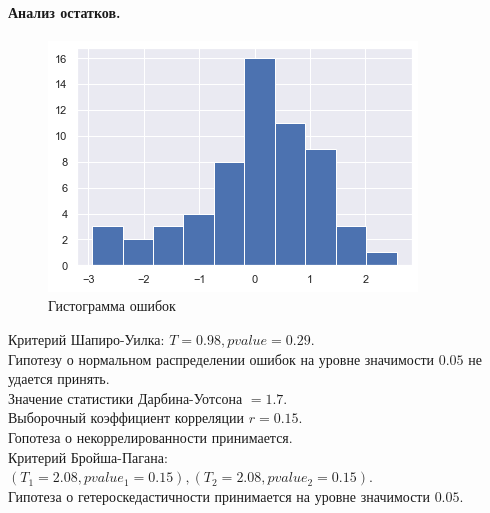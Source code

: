 \documentclass[a4paper,12pt]{article}
\begin{document}
\paragraph{Анализ остатков.\\}
\begin{figure}
    \vspace{-2ex}
    \includegraphics[width=\linewidth]{src/img/гистограмма_ошибок_1.png}
    \caption{Гистограмма ошибок}
\end{figure}

Критерий Шапиро-Уилка: $T = 0.98, pvalue = 0.29$.\\
Гипотезу о нормальном распределении ошибок на уровне значимости $0.05$ не удается принять.\\

Значение статистики Дарбина-Уотсона $ = 1.7$.\\
Выборочный коэффициент корреляции $r = 0.15$.\\
Гопотеза о некоррелированности принимается.\\

Критерий Бройша-Пагана: $(T_1 = 2.08, pvalue_1 = 0.15), (T_2 = 2.08, pvalue_2 = 0.15)$.\\
Гипотеза о гетероскедастичности принимается на уровне значимости $0.05$.\\
\end{document}
